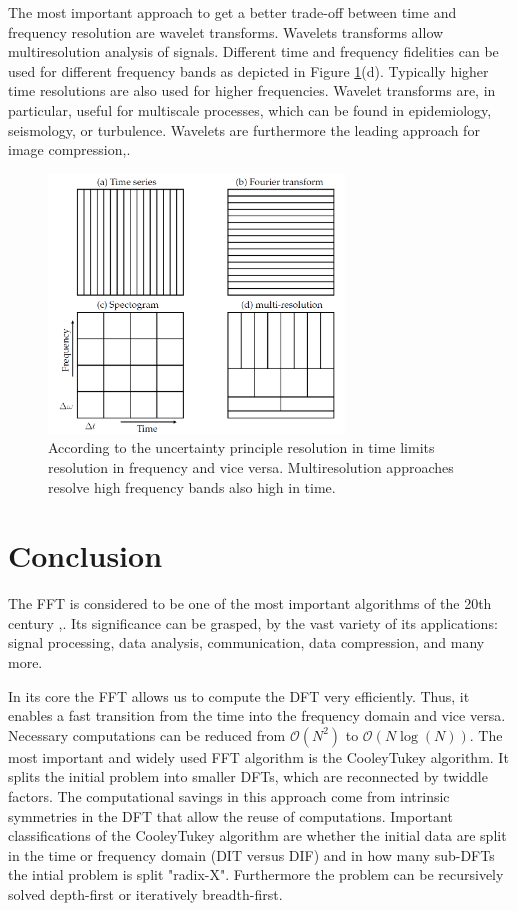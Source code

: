 \documentclass{usiinftr}
\begin{document}
The most important approach to get a better trade-off between time and frequency resolution are wavelet transforms.
Wavelets transforms allow multiresolution analysis of signals.
Different time and frequency fidelities can be used for different frequency bands as depicted in Figure \ref{Uncertainty}(d).
Typically higher time resolutions are also used for higher frequencies.
Wavelet transforms are, in particular, useful for multiscale processes, which can be found in epidemiology, seismology, or turbulence.
Wavelets are furthermore the leading approach for image compression\cite{brunton_kutz_2019},\cite{57199}.

\begin{figure}[h!] 
\centering
\includegraphics[width=0.7\textwidth]{figures/Uncertainty.png}
\caption{According to the uncertainty principle resolution in time limits resolution in frequency and vice versa.
Multiresolution approaches resolve high frequency bands also high in time\cite{brunton_kutz_2019}.  }
\label{Uncertainty}
\end{figure}

\section{Conclusion}
The FFT is considered to be one of the most important algorithms of the 20th century \cite{FFTTop10},\cite{brunton_kutz_2019}.
Its significance can be grasped, by the vast variety of its applications: signal processing, data analysis, communication, data compression, and many more.

In its core the FFT allows us to compute the DFT very efficiently.
Thus, it enables a fast transition from the time into the frequency domain and vice versa. Necessary computations can be reduced from $\mathcal{O}(N^2)$ to $\mathcal{O}(N \log(N))$. The most important and widely used FFT algorithm is the Cooley\textendash Tukey algorithm.
It splits the initial problem into smaller DFTs, which are reconnected by twiddle factors.
The computational savings in this approach come from intrinsic symmetries in the DFT that allow the reuse of computations.
Important classifications of the Cooley\textendash Tukey algorithm are whether the initial data are split in the time or frequency domain (DIT versus DIF) and in how many sub-DFTs the intial problem is split "radix-X".
Furthermore the problem can be recursively solved depth-first or iteratively breadth-first.
\end{document}
